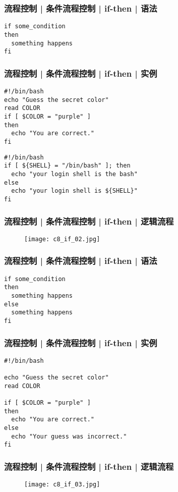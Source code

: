 \begin{frame}[fragile]
  \frametitle{流程控制 | 条件流程控制 | if-then | \alert{语法}}
\begin{lstlisting}
if some_condition
then
  something happens
fi
\end{lstlisting}
\end{frame}

\begin{frame}[fragile]
  \frametitle{流程控制 | 条件流程控制 | if-then | 实例}
\begin{lstlisting}
#!/bin/bash
echo "Guess the secret color"
read COLOR
if [ $COLOR = "purple" ]
then
  echo "You are correct."
fi
\end{lstlisting}
\pause
\begin{lstlisting}
#!/bin/bash
if [ ${SHELL} = "/bin/bash" ]; then
  echo "your login shell is the bash"
else
  echo "your login shell is ${SHELL}"
fi
\end{lstlisting}
\end{frame}

\begin{frame}
  \frametitle{流程控制 | 条件流程控制 | if-then | 逻辑流程}
  \begin{figure}
    \centering
    \texttt{[image: c8\_if\_02.jpg]}
  \end{figure}
\end{frame}

\begin{frame}[fragile]
  \frametitle{流程控制 | 条件流程控制 | if-then | \alert{语法}}
\begin{lstlisting}
if some_condition
then
  something happens
else
  something happens
fi
\end{lstlisting}
\end{frame}

\begin{frame}[fragile]
  \frametitle{流程控制 | 条件流程控制 | if-then | 实例}
\begin{lstlisting}
#!/bin/bash

echo "Guess the secret color"
read COLOR

if [ $COLOR = "purple" ]
then
  echo "You are correct."
else
  echo "Your guess was incorrect."
fi
\end{lstlisting}
\end{frame}

\begin{frame}
  \frametitle{流程控制 | 条件流程控制 | if-then | 逻辑流程}
  \begin{figure}
    \centering
    \texttt{[image: c8\_if\_03.jpg]}
  \end{figure}
\end{frame}

